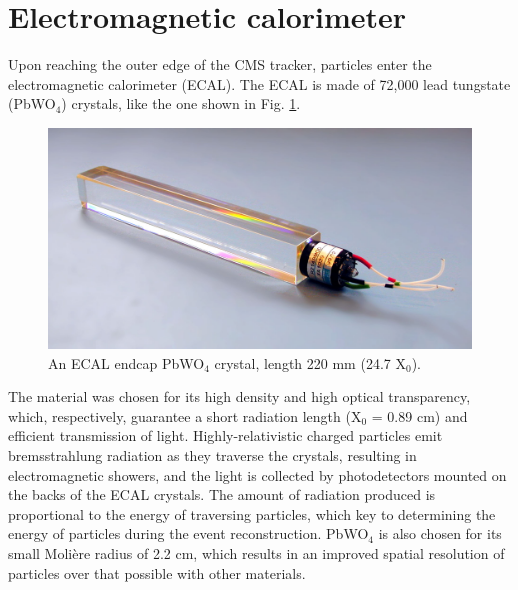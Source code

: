 \section{Electromagnetic calorimeter}
Upon reaching the outer edge of the CMS tracker, particles enter the electromagnetic calorimeter (ECAL). The ECAL is made of 72,000 lead tungstate (PbWO$_4$) crystals, like the one shown in Fig. \ref{fig:CmsTracker}. 
\begin{figure}[h]
\centering
\includegraphics[width=0.75\linewidth]{figures/CMS/PbWO4.jpg}
\caption{An ECAL endcap PbWO$_4$ crystal, length 220 mm (24.7 X$_0$).} 
\label{fig:CmsTracker}
\end{figure}
The material was chosen for its high density and high optical transparency, which, respectively, guarantee a short radiation length (X$_0$ = 0.89 cm) and efficient transmission of light. Highly-relativistic charged  particles emit bremsstrahlung radiation as they traverse the crystals, resulting in electromagnetic showers, and the light is collected by photodetectors mounted on the backs of the ECAL crystals. The amount of radiation produced is proportional to the energy of traversing particles, which key to determining the energy of particles during the event reconstruction. PbWO$_4$ is also chosen for its small Moli\`{e}re radius of 2.2 cm, which results in an improved spatial resolution of particles over that possible with other materials.
